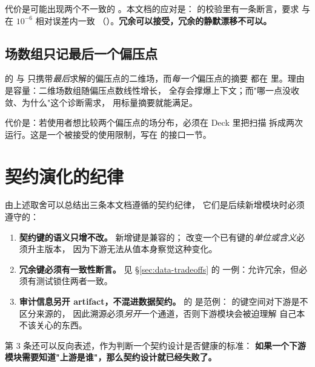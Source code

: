 代价是可能出现两个不一致的 。本文档的应对是：
 的校验里有一条断言，要求  与
 在 $10^{-6}$ 相对误差内一致
（）。\textbf{冗余可以接受，冗余的静默漂移不可以。}

\subsection{场数组只记最后一个偏压点}

 的  与 
只携带\emph{最后}求解的偏压点的二维场，而\emph{每一个}偏压点的摘要
都在  里。理由是容量：二维场数组随偏压点数线性增长，
全存会撑爆上下文；而"哪一点没收敛、为什么"这个诊断需求，
用标量摘要就能满足。

代价是：若使用者想比较两个偏压点的场分布，必须在 Deck 里把扫描
拆成两次运行。这是一个被接受的使用限制，写在 
的接口一节。

\section{契约演化的纪律}
\label{sec:data-evolution}

由上述取舍可以总结出三条本文档遵循的契约纪律，
它们是后续新增模块时必须遵守的：

\begin{enumerate}[leftmargin=1.9em,itemsep=0.4em,topsep=0.4em]
  \item \textbf{契约键的语义只增不改。} 新增键是兼容的；
        改变一个已有键的\emph{单位或含义}必须升主版本，
        因为下游无法从值本身察觉这种变化。
  \item \textbf{冗余键必须有一致性断言。} 见 \S\ref{sec:data-tradeoffs}
        的  一例：允许冗余，但必须有测试锁住两者一致。
  \item \textbf{审计信息另开 artifact，不混进数据契约。}
         的  是范例：
         的键空间对下游是不区分来源的，
        因此溯源必须\emph{另开}一个通道，否则下游模块会被迫理解
        自己本不该关心的东西。
\end{enumerate}

第 3 条还可以反向表述，作为判断一个契约设计是否健康的标准：
\textbf{如果一个下游模块需要知道"上游是谁"，那么契约设计就已经失败了。}

\cleardoublepage
